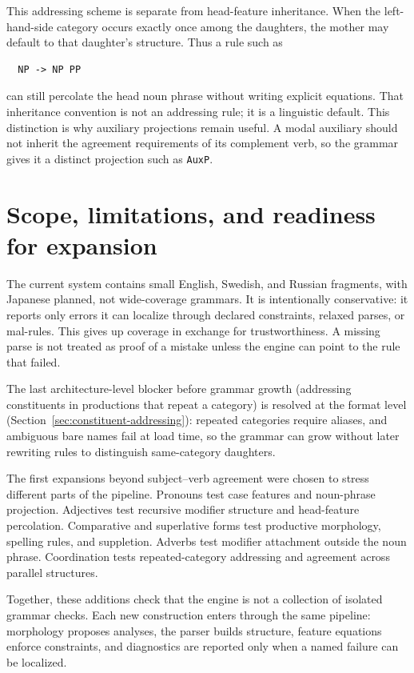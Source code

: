 \documentclass[11pt]{article}
\theoremstyle{definition}
\theoremstyle{plain}
\theoremstyle{remark}
\begin{document}
This addressing scheme is separate from head-feature inheritance. When the
left-hand-side category occurs exactly once among the daughters, the mother may
default to that daughter's structure. Thus a rule such as

\begin{verbatim}
  NP -> NP PP
\end{verbatim}

can still percolate the head noun phrase without writing explicit equations.
That inheritance convention is not an addressing rule; it is a linguistic
default. This distinction is why auxiliary projections remain useful. A modal
auxiliary should not inherit the agreement requirements of its complement verb,
so the grammar gives it a distinct projection such as \texttt{AuxP}.


\section{Scope, limitations, and readiness for expansion}

The current system contains small English, Swedish, and Russian fragments, with
Japanese planned, not wide-coverage grammars. It
is intentionally conservative: it reports only errors it can localize through
declared constraints, relaxed parses, or mal-rules. This gives up coverage in
exchange for trustworthiness. A missing parse is not treated as proof of a
mistake unless the engine can point to the rule that failed.

The last architecture-level blocker before grammar growth (addressing
constituents in productions that repeat a category) is resolved at the format
level (Section~\ref{sec:constituent-addressing}): repeated categories require
aliases, and ambiguous bare names fail at load time, so the grammar can grow
without later rewriting rules to distinguish same-category daughters.

The first expansions beyond subject--verb agreement were chosen to stress
different parts of the pipeline. Pronouns test case features and noun-phrase
projection. Adjectives test recursive modifier structure and head-feature
percolation. Comparative and superlative forms test productive morphology,
spelling rules, and suppletion. Adverbs test modifier attachment outside the
noun phrase. Coordination tests repeated-category addressing and agreement
across parallel structures.

Together, these additions check that the engine is not a collection of isolated
grammar checks. Each new construction enters through the same pipeline:
morphology proposes analyses, the parser builds structure, feature equations
enforce constraints, and diagnostics are reported only when a named failure can
be localized.
\end{document}
